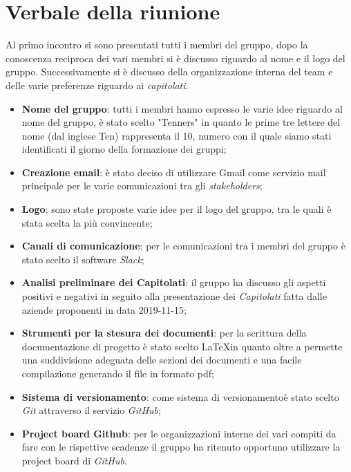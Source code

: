 \section{Verbale della riunione}
		Al primo incontro si sono presentati tutti i membri del gruppo, dopo la conoscenza reciproca dei vari membri si è discusso riguardo al nome e il logo del gruppo. Successivamente si è discusso della organizzazione interna del team e delle varie preferenze riguardo ai \textit{capitolati\glos}. 
	\begin{itemize}
		\item \textbf {Nome del gruppo}: tutti i membri hanno espresso le varie idee riguardo al nome del gruppo, è stato scelto "Tenners" in quanto le prime tre lettere del nome (dal inglese Ten) rappresenta il 10, numero con il quale siamo stati identificati il giorno della formazione dei gruppi;
		\item \textbf {Creazione email}: è stato deciso di utilizzare Gmail come servizio mail principale per le varie comunicazioni tra gli \textit{stakeholders\glos};
		\item \textbf {Logo}: sono state proposte varie idee per il logo del gruppo, tra le quali è stata scelta la più convincente;
		\item \textbf {Canali di comunicazione}: per le comunicazioni tra i membri del gruppo è stato scelto il software \textit{Slack\glos};
		\item \textbf {Analisi preliminare dei Capitolati\glos}: il gruppo ha discusso gli aspetti positivi e negativi in seguito alla presentazione dei \textit{Capitolati\glo} fatta dalle aziende proponenti in data 2019-11-15;
		\item \textbf {Strumenti per la stesura dei documenti}: per la scrittura della documentazione di progetto è stato scelto \LaTeX  in quanto oltre a permette una suddivisione adeguata delle sezioni dei documenti e una facile compilazione generando il file in formato pdf;
		\item \textbf {Sistema di versionamento\glo}: come sistema di versionamento\glo è stato scelto \textit{Git\glo} attraverso il servizio \textit{GitHub\glos};
		\item \textbf {Project board Github\glos}: per le organizzazioni interne dei vari compiti da fare con le rispettive scadenze il gruppo ha ritenuto opportuno utilizzare la project board di \textit{GitHub\glos}.
	\end{itemize}


